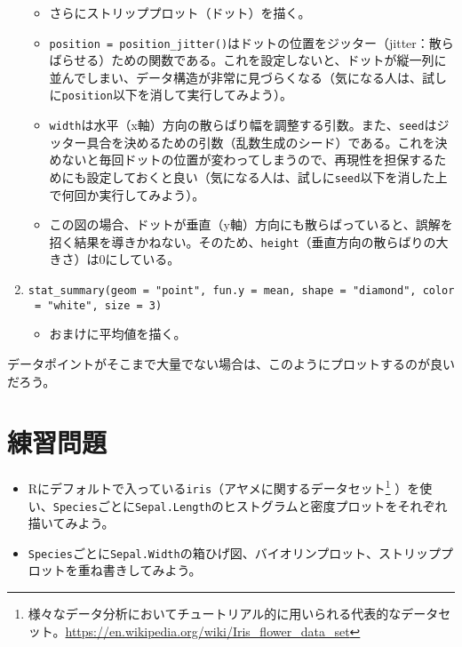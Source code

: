 \documentclass[]{book}
\providecommand{\tightlist}{%
  \setlength{\itemsep}{0pt}\setlength{\parskip}{0pt}}
\let\rmarkdownfootnote\footnote%
\def\footnote{\protect\rmarkdownfootnote}
\begin{document}
\begin{enumerate}
  \begin{itemize}
  \item
    さらにストリッププロット（ドット）を描く。
  \item
    \texttt{position\ =\ position\_jitter()}はドットの位置をジッター（jitter：散らばらせる）ための関数である。これを設定しないと、ドットが縦一列に並んでしまい、データ構造が非常に見づらくなる（気になる人は、試しに\texttt{position}以下を消して実行してみよう）。
  \item
    \texttt{width}は水平（x軸）方向の散らばり幅を調整する引数。また、\texttt{seed}はジッター具合を決めるための引数（乱数生成のシード）である。これを決めないと毎回ドットの位置が変わってしまうので、再現性を担保するためにも設定しておくと良い（気になる人は、試しに\texttt{seed}以下を消した上で何回か実行してみよう）。
  \item
    この図の場合、ドットが垂直（y軸）方向にも散らばっていると、誤解を招く結果を導きかねない。そのため、\texttt{height}（垂直方向の散らばりの大きさ）は0にしている。
  \end{itemize}
\item
  \texttt{stat\_summary(geom\ =\ "point",\ fun.y\ =\ mean,\ shape\ =\ "diamond",\ color\ =\ "white",\ size\ =\ 3)}

  \begin{itemize}
  \tightlist
  \item
    おまけに平均値を描く。
  \end{itemize}
\end{enumerate}

データポイントがそこまで大量でない場合は、このようにプロットするのが良いだろう。

\section{練習問題}\label{-1}

\begin{itemize}
\item
  Rにデフォルトで入っている\texttt{iris}（アヤメに関するデータセット\footnote{様々なデータ分析においてチュートリアル的に用いられる代表的なデータセット。\url{https://en.wikipedia.org/wiki/Iris_flower_data_set}}
  ）を使い、\texttt{Species}ごとに\texttt{Sepal.Length}のヒストグラムと密度プロットをそれぞれ描いてみよう。
\item
  \texttt{Species}ごとに\texttt{Sepal.Width}の箱ひげ図、バイオリンプロット、ストリッププロットを重ね書きしてみよう。
\end{itemize}
\end{document}

